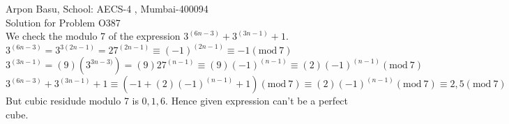 \documentclass[10pt,a4paper]{extarticle}
\begin{document}
Arpon Basu, School: AECS-4 , Mumbai-400094\\
Solution for Problem O387 \\
We check the modulo 7 of the expression $3^{(6n-3)} + 3^{(3n-1)} + 1 $. \\
$3^{(6n-3)} = 3^{3(2n-1)}=27^{(2n-1)} \equiv (-1)^{(2n-1)} \equiv -1 (\textrm{mod}\ 7) $ \\
$3^{(3n-1)} =(9)(3^{3n-3)})=(9)27^{(n-1)} \equiv (9)(-1)^{(n-1)} \equiv (2)(-1)^{(n-1)} (\textrm{mod}\ 7) $ \\
$3^{(6n-3)} + 3^{(3n-1)} + 1  \equiv (-1+(2)(-1)^{(n-1)}+1) (\textrm{mod}\ 7) \equiv (2)(-1)^{(n-1)} (\textrm{mod}\ 7) \equiv 2,5 (\textrm{mod}\ 7) $ \\
But cubic residude modulo 7 is ${0,1,6}$. Hence given expression can't be a perfect cube.
 
\end{document}
